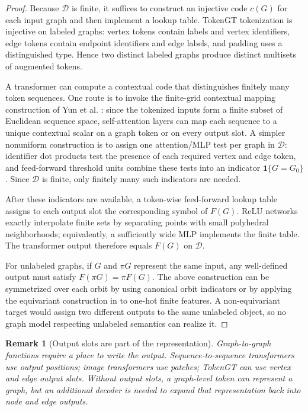 \documentclass[11pt]{article}
\newtheorem{remark}[theorem]{Remark}
\newcommand{\one}{\mathbf{1}}
\newcommand{\cD}{\mathcal{D}}
\begin{document}
\begin{proof}
Because $\cD$ is finite, it suffices to construct an injective code $c(G)$ for each input graph and then implement a lookup table.  TokenGT tokenization is injective on labeled graphs: vertex tokens contain labels and vertex identifiers, edge tokens contain endpoint identifiers and edge labels, and padding uses a distinguished type.  Hence two distinct labeled graphs produce distinct multisets of augmented tokens.

A transformer can compute a contextual code that distinguishes finitely many token sequences.  One route is to invoke the finite-grid contextual mapping construction of Yun et al. \cite{yun2020universal}: since the tokenized inputs form a finite subset of Euclidean sequence space, self-attention layers can map each sequence to a unique contextual scalar on a graph token or on every output slot.  A simpler nonuniform construction is to assign one attention/MLP test per graph in $\cD$: identifier dot products test the presence of each required vertex and edge token, and feed-forward threshold units combine these tests into an indicator $\one\{G=G_0\}$.  Since $\cD$ is finite, only finitely many such indicators are needed.

After these indicators are available, a token-wise feed-forward lookup table assigns to each output slot the corresponding symbol of $F(G)$.  ReLU networks exactly interpolate finite sets by separating points with small polyhedral neighborhoods; equivalently, a sufficiently wide MLP implements the finite table.  The transformer output therefore equals $F(G)$ on $\cD$.

For unlabeled graphs, if $G$ and $\pi G$ represent the same input, any well-defined output must satisfy $F(\pi G)=\pi F(G)$.  The above construction can be symmetrized over each orbit by using canonical orbit indicators or by applying the equivariant construction in  to one-hot finite features.  A non-equivariant target would assign two different outputs to the same unlabeled object, so no graph model respecting unlabeled semantics can realize it.
\end{proof}

\begin{remark}[Output slots are part of the representation]
Graph-to-graph functions require a place to write the output.  Sequence-to-sequence transformers use output positions; image transformers use patches; TokenGT can use vertex and edge output slots.  Without output slots, a graph-level token can represent a graph, but an additional decoder is needed to expand that representation back into node and edge outputs.
\end{remark}
\end{document}
